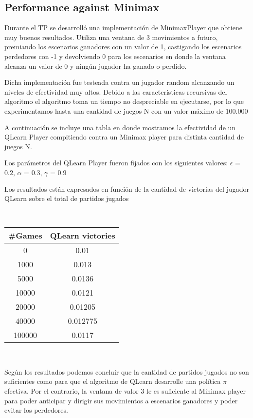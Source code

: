 \subsection{Performance against Minimax}

Durante el TP se desarrolló una implementación de MinimaxPlayer que obtiene muy buenos resultados.
Utiliza una ventana de 3 movimientos a futuro, premiando los escenarios ganadores con un valor de 1,
castigando los escenarios perdedores con -1 y devolviendo 0 para los escenarios en donde la ventana alcanza
un valor de 0 y ningún jugador ha ganado o perdido.

Dicha implementación fue testeada contra un jugador random alcanzando un niveles de efectividad muy altos.
Debido a las características recursivas del algoritmo el algoritmo toma un tiempo no despreciable en ejecutarse,
por lo que experimentamos hasta una cantidad de juegos N con un valor máximo de 100.000

A continuación se incluye una tabla en donde mostramos la efectividad de un QLearn Player compitiendo contra
un Minimax player para distinta cantidad de juegos N.

Los parámetros del QLearn Player fueron fijados con los siguientes valores:
$\epsilon$ = 0.2, $\alpha$ = 0.3, $\gamma$ = 0.9

Los resultados están expresados en función de la cantidad de victorias del jugador QLearn sobre el total de partidos
jugados

~

\begin{center}
\begin{tabular}{c c}
	\toprule
	\textbf{\#Games} & \textbf{QLearn victories} \\
	\midrule
	0 & 0.01 \\
	1000 & 0.013 \\
	5000 & 0.0136 \\
	10000 & 0.0121 \\
	20000 & 0.01205 \\
	40000 & 0.012775 \\
	100000 & 0.0117 \\
	\bottomrule
\end{tabular}
\end{center}

~

Según los resultados podemos concluir que la cantidad de partidos jugados no son suficientes como para que el
algoritmo de QLearn desarrolle una política $\pi$ efectiva. Por el contrario, la ventana de valor 3
le es suficiente al Minimax player para poder anticipar y dirigir sus movimientos a escenarios ganadores y poder
evitar los perdedores.

